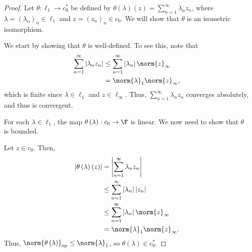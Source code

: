 \documentclass[10pt]{mypackage}
\begin{document}
\begin{proof}
  Let $\theta: \ell_1\rightarrow c_0^{\ast}$ be defined by $\theta\left(\lambda\right)\left(z\right) = \sum_{n=1}^{\infty}\lambda_nz_n$, where $\lambda = \left(\lambda_n\right)_n\in \ell_1$ and $z = \left(z_n\right)_n \in c_0$. We will show that $\theta$ is an isometric isomorphism.\newline

  We start by showing that $\theta$ is well-defined. To see this, note that
  \begin{align*}
    \sum_{n=1}^{\infty}\left\vert \lambda_nz_n \right\vert &\leq \sum_{n=1}^{\infty}\left\vert \lambda_n \right\vert\norm{z}_{\infty}\\
                                                           &= \norm{\lambda}_1\norm{z}_{\infty},
  \end{align*}
  which is finite since $\lambda\in \ell_1$ and $z\in \ell_{\infty}$. Thus, $\sum_{n=1}^{\infty}\lambda_nz_n$ converges absolutely, and thus is convergent.\newline

  For each $\lambda\in \ell_1$, the map $\theta\left(\lambda\right): c_0\rightarrow \F$ is linear. We now need to show that $\theta$ is bounded.\newline

  Let $z\in c_0$. Then,
  \begin{align*}
    \left\vert \theta\left(\lambda\right)\left(z\right) \right\vert &= \left\vert \sum_{n=1}^{\infty}\lambda_nz_n \right\vert\\
                                                                    &\leq \sum_{n=1}^{\infty}\left\vert \lambda_n \right\vert\left\vert z_n \right\vert\\
                                                                    &\leq \sum_{n=1}^{\infty}\left\vert \lambda_n \right\vert\norm{z}_{\infty}\\
                                                                    &= \norm{\lambda}_1\norm{z}_{\infty}.
  \end{align*}
  Thus, $\norm{\theta\left(\lambda\right)}_{\text{op}}\leq \norm{\lambda}_1$, so $\theta\left(\lambda\right) \in c_0^{\ast}$.\newline


\end{proof}
\end{document}
